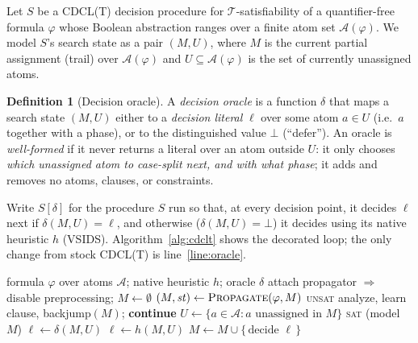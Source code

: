 \documentclass[letterpaper]{article} %
\theoremstyle{definition}
\newtheorem{definition}{Definition}
\theoremstyle{plain}
\theoremstyle{remark}
\newcommand{\Atoms}{\mathcal{A}}
\newcommand{\Undec}{U}
\newcommand{\defer}{\bot}
\begin{document}
Let $S$ be a \textsc{CDCL(T)} decision procedure for $\mathcal{T}$-satisfiability
of a quantifier-free formula $\varphi$ whose Boolean abstraction ranges over
a finite atom set $\Atoms(\varphi)$. We model $S$'s search state as a pair
$(M,\Undec)$, where $M$ is the current partial assignment (trail) over
$\Atoms(\varphi)$ and $\Undec\subseteq\Atoms(\varphi)$ is the set of
currently unassigned atoms.

\begin{definition}[Decision oracle]
\label{def:oracle}
A \emph{decision oracle} is a function $\delta$ that maps a search state
$(M,\Undec)$ either to a \emph{decision literal} $\ell$ over some atom
$a\in\Undec$ (i.e.\ $a$ together with a phase), or to the distinguished value
$\defer$ (``defer''). An oracle is \emph{well-formed} if it never returns a
literal over an atom outside $\Undec$: it only chooses \emph{which
unassigned atom to case-split next, and with what phase}; it adds and removes
no atoms, clauses, or constraints.
\end{definition}

Write $S[\delta]$ for the procedure $S$ run so that, at every decision point,
it decides $\ell$ next if $\delta(M,\Undec)=\ell$, and otherwise
($\delta(M,\Undec)=\defer$) it decides using its native heuristic $h$
(VSIDS). Algorithm~\ref{alg:cdclt} shows the decorated loop; the only change
from stock \textsc{CDCL(T)} is line~\ref{line:oracle}.

\begin{algorithm}[t]
\caption{\textsc{CDCL(T)} with a decision oracle}
\label{alg:cdclt}
\begin{algorithmic}[1]
\REQUIRE formula $\varphi$ over atoms $\Atoms$; native heuristic $h$; oracle $\delta$
\STATE attach propagator $\Rightarrow$ disable preprocessing; $M \gets \emptyset$
\LOOP
  \STATE $(M,\mathit{st}) \gets \textsc{Propagate}(\varphi, M)$ 
      \RETURN \textsc{unsat} \ENDIF
     \STATE analyze, learn clause, backjump$(M)$; \textbf{continue}
  \ENDIF
  \STATE $\Undec \gets \{a\in\Atoms : a \text{ unassigned in } M\}$
  \IF{$\Undec = \emptyset$} \RETURN \textsc{sat} (model $M$) \ENDIF
  \STATE $\ell \gets \delta(M,\Undec)$ \label{line:oracle} 
  \IF{$\ell = \defer$} \STATE $\ell \gets h(M,\Undec)$  \ENDIF
  \STATE $M \gets M \cup \{\,\text{decide } \ell\,\}$
\ENDLOOP
\end{algorithmic}
\end{algorithm}
\end{document}
